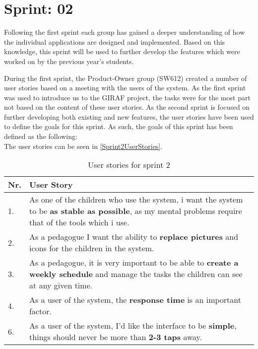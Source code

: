 \chapter{Sprint: 02}
Following the first sprint each group has gained a deeper understanding of how
the individual applications are designed and implemented. Based on this
knowledge, this sprint will be used to further develop the features which were
worked on by the previous year's students.\nl

During the first sprint, the Product-Owner group (SW612) created a number of
user stories based on a meeting with the users of the system. As the first
sprint was used to introduce us to the GIRAF project, the tasks were for the
most part not based on the content of these user stories. As the second sprint
is focused on further developing both existing and new features, the user
stories have been used to define the goals for this sprint. As such, the goals
of this sprint has been defined as the following:\\
 The user stories can be seen in \autoref{Sprint2UserStories}.


\begin{table}[H]
\centering 
\begin{tabular}{|l|p{12.5cm}|}
\hline
Nr. & User Story \\\hline
1. & As one of the children who use the system, i want the system to be 
\textbf{as stable as possible}, as my mental problems require that of the tools
which i use. \\ \hline
2. & As a pedagogue I want the ability to \textbf{replace pictures} and icons
for the children in the system.\\ \hline
3. & As a pedagogue, it is very important to be able to \textbf{create a weekly
schedule} and manage the tasks the children can see at any given time.\\ \hline
4. & As a user of the system, the \textbf{response time} is an important
factor.\\ \hline
6. & As a user of the system, I'd like the interface to be \textbf{simple},
things should never be more than \textbf{2-3 taps} away. \\\hline
\end{tabular}
\caption{User stories for sprint 2}
\label{Sprint2UserStories}
\end{table}

